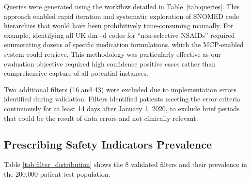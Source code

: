     Queries were generated using the workflow detailed in Table~\ref{tab:queries}. This approach enabled rapid iteration and systematic exploration of SNOMED code hierarchies that would have been prohibitively time-consuming manually. For example, identifying all UK dm+d codes for ``non-selective NSAIDs'' required enumerating dozens of specific medication formulations, which the MCP-enabled system could retrieve. This methodology was particularly effective as our evaluation objective required high confidence positive cases rather than comprehensive capture of all potential instances.

    Two additional filters (16 and 43) were excluded due to implementation errors identified during validation. Filters identified patients meeting the error criteria continuously for at least 14 days after January 1, 2020, to exclude brief periods that could be the result of data errors and not clinically relevant.

\subsection{Prescribing Safety Indicators Prevalence}
\label{app:prescribing-safety-indicators-prevalence}

    Table \ref{tab:filter_distribution} shows the 8 validated filters and their prevalence in the 200,000-patient test population. 

